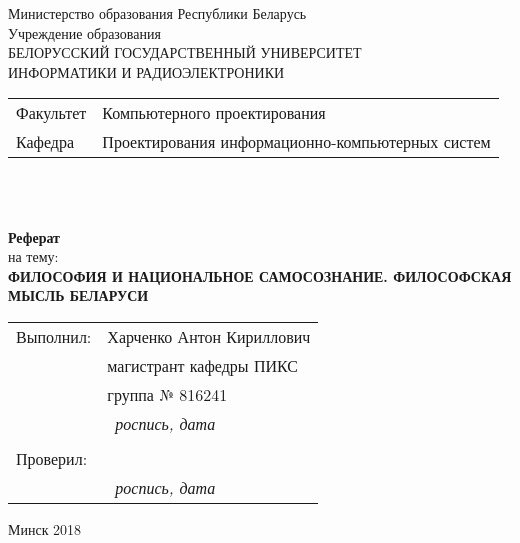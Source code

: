 \begin{titlepage}
  \begin{center}
    Министерство образования Республики Беларусь\\[1em]
    Учреждение образования\\
    БЕЛОРУССКИЙ ГОСУДАРСТВЕННЫЙ УНИВЕРСИТЕТ \\
    ИНФОРМАТИКИ И РАДИОЭЛЕКТРОНИКИ\\[1em]

    \begin{minipage}{\textwidth}
      \begin{flushleft}
        \begin{tabular}{ l l }
          Факультет & Компьютерного проектирования\\
          Кафедра   & Проектирования информационно-компьютерных систем
        \end{tabular}
      \end{flushleft}
    \end{minipage}\\[3em]

	\begin{minipage}{0.4\textwidth}
		
	\end{minipage}\\[2.2em]

    \textbf{Реферат}\\
    {на тему:}\\[1em]
    \textbf{\large\MakeUppercase{Философия и национальное самосознание. Философская мысль Беларуси}}\\[1em]

    
    \begin{flushright}
      \begin{tabular}{ l l }
        Выполнил: & Харченко Антон Кириллович\\
        & магистрант кафедры ПИКС\\
        & группа № 816241\\
        & \hrulefill \ \textit{роспись, дата}\\
        & \\
        Проверил: & \hrulefill \\
        & \hrulefill \ \textit{роспись, дата}\\
      \end{tabular}
    \end{flushright}
    
    \vfill
    {\normalsize Минск 2018}
  \end{center}
\end{titlepage}